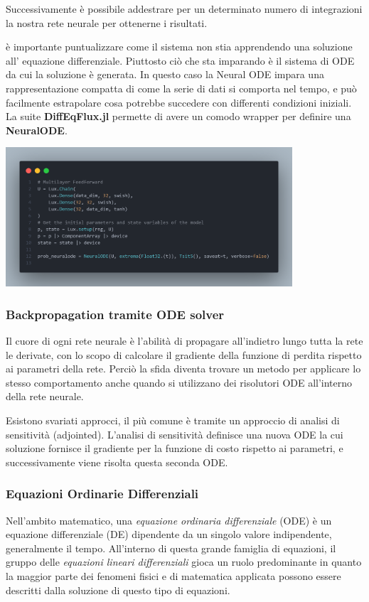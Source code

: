 Successivamente è possibile addestrare per un determinato numero di integrazioni 
la nostra rete neurale per ottenerne i risultati. 

è importante puntualizzare come il sistema non stia apprendendo una soluzione all'
equazione differenziale. Piuttosto ciò che sta imparando è il sistema di ODE da cui 
la soluzione è generata. In questo caso la Neural ODE impara una rappresentazione 
compatta di come la serie di dati si comporta nel tempo, e può facilmente estrapolare
cosa potrebbe succedere con differenti condizioni iniziali. La suite \textbf{DiffEqFlux.jl} \cite{chen2019neural} permette di avere un comodo wrapper 
per definire una \textbf{NeuralODE}.

\begin{minipage}{\linewidth}
    \centering
    \includegraphics[width=0.8\textwidth]{img/fneuralode.png}
    \label{fig:NeuralODE_Julia_example}
\end{minipage}

\subsubsection*{Backpropagation tramite ODE solver}
Il cuore di ogni rete neurale è l'abilità di propagare all'indietro lungo tutta la 
rete le derivate, con lo scopo di calcolare il gradiente della funzione di perdita
rispetto ai parametri della rete. Perciò la sfida diventa trovare un metodo per
applicare lo stesso comportamento anche quando si utilizzano dei risolutori ODE 
all'interno della rete neurale.

Esistono svariati approcci, il più comune è tramite un approccio di analisi di sensitività (adjointed).
L'analisi di sensitività definisce una nuova ODE la cui soluzione fornisce il gradiente per 
la funzione di costo rispetto ai parametri, e successivamente viene risolta questa seconda
ODE.

\subsubsection*{Equazioni Ordinarie Differenziali}
Nell'ambito matematico, una \emph{equazione ordinaria differenziale} (ODE) è un 
equazione differenziale (DE) dipendente da un singolo valore indipendente, 
generalmente il tempo. All'interno di questa grande famiglia di equazioni, 
il gruppo delle \emph{equazioni lineari differenziali} gioca un ruolo predominante
in quanto la maggior parte dei fenomeni fisici e di matematica applicata possono 
essere descritti dalla soluzione di questo tipo di equazioni. 

